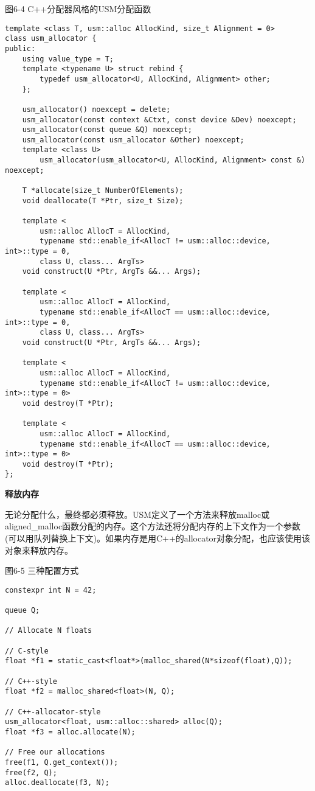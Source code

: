 \hspace*{\fill} \par %
图6-4 C++分配器风格的USM分配函数
\begin{lstlisting}[caption={}]
template <class T, usm::alloc AllocKind, size_t Alignment = 0>
class usm_allocator {
public:
	using value_type = T;
	template <typename U> struct rebind {
		typedef usm_allocator<U, AllocKind, Alignment> other;
	};

	usm_allocator() noexcept = delete;
	usm_allocator(const context &Ctxt, const device &Dev) noexcept;
	usm_allocator(const queue &Q) noexcept;
	usm_allocator(const usm_allocator &Other) noexcept;
	template <class U> 
		usm_allocator(usm_allocator<U, AllocKind, Alignment> const &) noexcept;
		
	T *allocate(size_t NumberOfElements); 
	void deallocate(T *Ptr, size_t Size); 
	
	template <
		usm::alloc AllocT = AllocKind,
		typename std::enable_if<AllocT != usm::alloc::device, int>::type = 0,
		class U, class... ArgTs>
	void construct(U *Ptr, ArgTs &&... Args); 
	
	template <
		usm::alloc AllocT = AllocKind,
		typename std::enable_if<AllocT == usm::alloc::device, int>::type = 0,
		class U, class... ArgTs>
	void construct(U *Ptr, ArgTs &&... Args); 
	
	template <
		usm::alloc AllocT = AllocKind,
		typename std::enable_if<AllocT != usm::alloc::device, int>::type = 0>
	void destroy(T *Ptr);
	
	template <
		usm::alloc AllocT = AllocKind,
		typename std::enable_if<AllocT == usm::alloc::device, int>::type = 0>
	void destroy(T *Ptr);
};
\end{lstlisting}

\hspace*{\fill} \par %
\textbf{释放内存}

无论分配什么，最终都必须释放。USM定义了一个方法来释放malloc或aligned\_malloc函数分配的内存。这个方法还将分配内存的上下文作为一个参数(可以用队列替换上下文)。如果内存是用C++的allocator对象分配，也应该使用该对象来释放内存。\par

\hspace*{\fill} \par %
图6-5 三种配置方式
\begin{lstlisting}[caption={}]
constexpr int N = 42;

queue Q;

// Allocate N floats

// C-style
float *f1 = static_cast<float*>(malloc_shared(N*sizeof(float),Q));

// C++-style
float *f2 = malloc_shared<float>(N, Q);

// C++-allocator-style
usm_allocator<float, usm::alloc::shared> alloc(Q);
float *f3 = alloc.allocate(N);

// Free our allocations
free(f1, Q.get_context());
free(f2, Q);
alloc.deallocate(f3, N);
\end{lstlisting}

